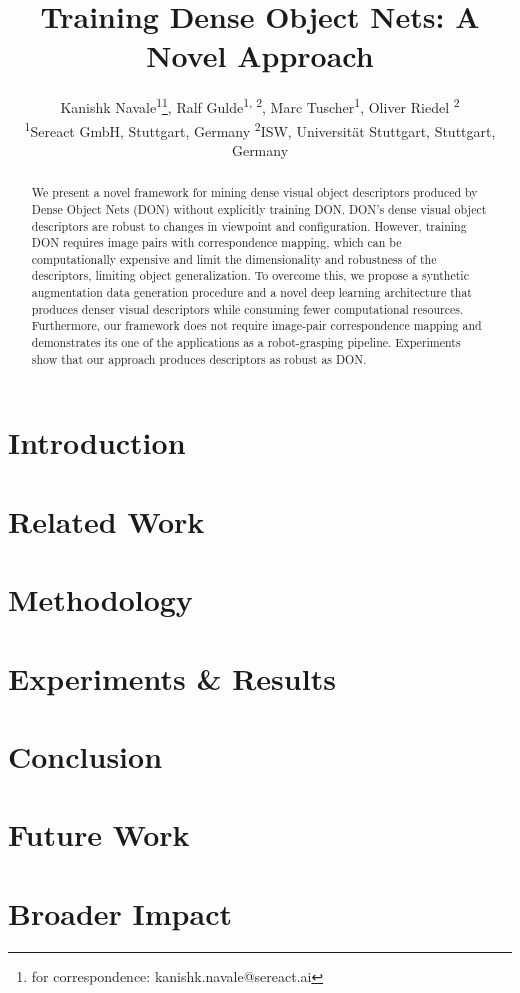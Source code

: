 \documentclass[english]{article}
\title{Training Dense Object Nets: A Novel Approach}
\author{%
  Kanishk Navale\textsuperscript{1}\thanks{for correspondence: kanishk.navale@sereact.ai}, \quad
  Ralf Gulde\textsuperscript{1, 2}, \quad
  Marc Tuscher\textsuperscript{1}, \quad
  Oliver Riedel \textsuperscript{2}\\
  \textsuperscript{1}Sereact GmbH, Stuttgart, Germany \quad
  \textsuperscript{2}ISW, Universität Stuttgart, Stuttgart, Germany\\
}
\begin{document}
\maketitle

\begin{abstract}
  We present a novel framework for mining dense visual object descriptors produced by Dense Object Nets (DON) without 
  explicitly training DON. DON's dense visual object descriptors are robust to changes in viewpoint and configuration.
  However, training DON requires image pairs with correspondence mapping, which can be computationally expensive and 
  limit the dimensionality and robustness of the descriptors, limiting object generalization. 
  To overcome this, we propose a synthetic augmentation data generation procedure and a novel deep 
  learning architecture that produces denser visual descriptors while consuming fewer computational resources. 
  Furthermore, our framework does not require image-pair correspondence mapping and demonstrates its one of the applications 
  as a robot-grasping pipeline. Experiments show that our approach produces descriptors as robust as DON.
\end{abstract}

\section{Introduction}


\section{Related Work}


\section{Methodology}


\section{Experiments \& Results}


\section{Conclusion}


\section{Future Work}


\section*{Broader Impact}

\printbibliography
\end{document}
